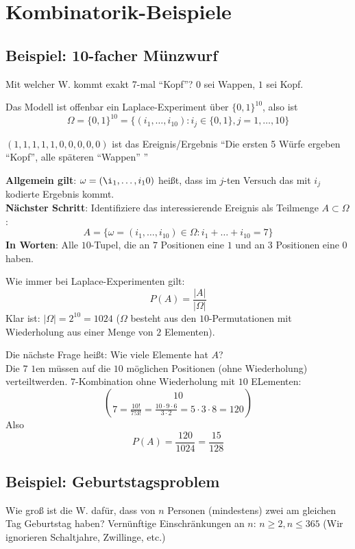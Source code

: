 \section{Kombinatorik-Beispiele}

\subsection{Beispiel: 10-facher Münzwurf}

Mit welcher W. kommt exakt 7-mal ``Kopf''?
$0$ sei Wappen, $1$ sei Kopf.

Das Modell ist offenbar ein Laplace-Experiment über $\{0,1\}^10$, also ist 
\[\Omega=\{0,1\}^10 = \{ (i_1,\ldots,i_10) : i_j \in \{0,1\}, j = 1,\ldots,10 \}\]

$(1,1,1,1,1,0,0,0,0,0)$ ist das Ereignis/Ergebnis ``Die ersten 5 Würfe ergeben ``Kopf'', alle späteren ``Wappen'' ''

\noindent \textbf{Allgemein gilt}: 
$\omega = (\i_1,\ldots,i_10)$ heißt, dass im $j$-ten Versuch das mit $i_j$ kodierte Ergebnis kommt.\\
\textbf{Nächster Schritt}:
Identifiziere das interessierende Ereignis als Teilmenge $A \subset \Omega$:
\[ A = \{ \omega=(i_1,\ldots,i_10) \in \Omega : i_1+\ldots + i_10 = 7 \} \]
\textbf{In Worten}:
Alle $10$-Tupel, die an $7$ Positionen eine $1$ und an $3$ Positionen eine $0$ haben.

\noindent Wie immer bei Laplace-Experimenten gilt: 
\[P(A) = \frac{|A|}{|\Omega|} \]
Klar ist: $|\Omega| = 2^{10} = 1024$ ($\Omega$ besteht aus den $10$-Permutationen mit Wiederholung aus einer Menge von $2$ Elementen).

\noindent Die nächste Frage heißt: 
Wie viele Elemente hat $A$?\\
Die $7$ $1$en müssen auf die $10$ möglichen Positionen (ohne Wiederholung) verteiltwerden.
$7$-Kombination ohne Wiederholung mit $10$ ELementen:
\[ 10 \choose 7 = \frac{10!}{7!3!} = \frac{10\cdot 9 \cdot 6}{3 \cdot 2} = 5 \cdot 3 \cdot 8 = 120 \]
Also \[ P(A) = \frac{120}{1024} = \frac{15}{128} \]

\subsection{Beispiel: Geburtstagsproblem}

Wie groß ist die W. dafür, dass von $n$ Personen (mindestens) zwei am gleichen Tag Geburtstag haben?
Vernünftige Einschränkungen an $n$: $n \geq 2, n \leq 365$ (Wir ignorieren Schaltjahre, Zwillinge, etc.)

